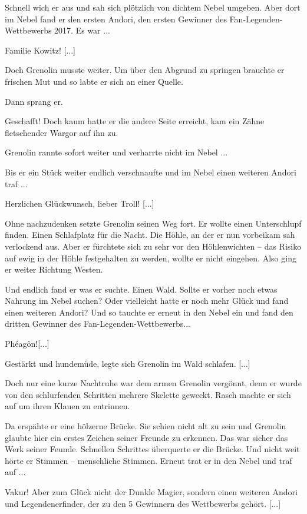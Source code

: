 \documentclass[10pt, a4paper, oneside]{book}
\begin{document}
\begin{multicols}{2}
Schnell wich er aus und sah sich plötzlich von dichtem Nebel umgeben. Aber dort im Nebel fand er den ersten Andori, den ersten Gewinner des Fan-Legenden-Wettbewerbs 2017. Es war ...

Familie Kowitz! [...]

Doch Grenolin musste weiter. Um über den Abgrund zu springen brauchte er frischen Mut und so labte er sich an einer Quelle.

Dann sprang er.

Geschafft! Doch kaum hatte er die andere Seite erreicht, kam ein Zähne fletschender Wargor auf ihn zu.

Grenolin rannte sofort weiter und verharrte nicht im Nebel ...

Bis er ein Stück weiter endlich verschnaufte und im Nebel einen weiteren Andori traf ...

Herzlichen Glückwunsch, lieber Troll! [...]

Ohne nachzudenken setzte Grenolin seinen Weg fort. Er wollte einen Unterschlupf finden. Einen Schlafplatz für die Nacht. Die Höhle, an der er nun vorbeikam sah verlockend aus. Aber er fürchtete sich zu sehr vor den Höhlenwichten – das Risiko auf ewig in der Höhle festgehalten zu werden, wollte er nicht eingehen. Also ging er weiter Richtung Westen.


Und endlich fand er was er suchte. Einen Wald. Sollte er vorher noch etwas Nahrung im Nebel suchen? Oder vielleicht hatte er noch mehr Glück und fand einen weiteren Andori?
Und so tauchte er erneut in den Nebel ein und fand den dritten Gewinner des Fan-Legenden-Wettbewerbs...

Phéagôn![...]

Gestärkt und hundemüde, legte sich Grenolin im Wald schlafen. [...]

Doch nur eine kurze Nachtruhe war dem armen Grenolin vergönnt, denn er wurde von den schlurfenden Schritten mehrere Skelette geweckt. Rasch machte er sich auf um ihren Klauen zu entrinnen.

Da erspähte er eine hölzerne Brücke. Sie schien nicht alt zu sein und Grenolin glaubte hier ein erstes Zeichen seiner Freunde zu erkennen. Das war sicher das Werk seiner Feunde. Schnellen Schrittes überquerte er die Brücke. Und nicht weit hörte er Stimmen – menschliche Stimmen. Erneut trat er in den Nebel und traf auf ...

Vakur! Aber zum Glück nicht der Dunkle Magier, sondern einen weiteren Andori und Legendenerfinder, der zu den 5 Gewinnern des Wettbewerbs gehört. [...]


\end{multicols}
\end{document}
